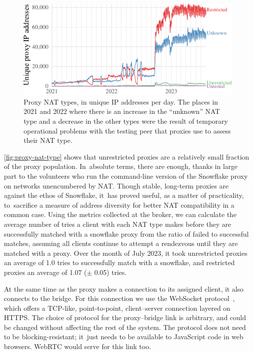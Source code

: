 \documentclass[letterpaper,twocolumn]{article}
\begin{document}
\begin{figure}
\includegraphics{figures/proxies/proxy-nat-type}
\caption{
Proxy NAT types, in unique IP addresses per day.
The places in 2021 and 2022
where there is an increase in the ``unknown'' NAT type
and a decrease in the other types
were the result of temporary operational problems with the
testing peer that proxies use to assess their NAT type.
}
\label{fig:proxy-nat-type}
\end{figure}

\autoref{fig:proxy-nat-type}
shows that unrestricted proxies are
a relatively small fraction of the proxy population.
In~absolute terms, there are enough,
thanks in large part to the volunteers who run
the command-line
version of the Snowflake proxy
on networks unencumbered by NAT.
Though stable, long-term proxies are
against the ethos of Snowflake,
it~has proved useful, as a matter of practicality,
to~sacrifice a measure of address diversity
for better NAT compatibility in a common case.
Using the metrics collected at the broker, we can
calculate the average number of tries a client with
each NAT type makes before they are successfully
matched with a snowflake proxy from the ratio of
failed to successful matches, assuming all clients continue
to attempt a rendezvous until they are matched
with a proxy. Over the month
of July 2023, it took unrestricted proxies
an average of 1.0 tries
to successfully match with a snowflake, and restricted
proxies an average of 1.07 ($\pm$ 0.05) tries.

At the same time as the proxy makes a connection to its assigned client,
it also connects to the bridge.
For this connection we
use the WebSocket protocol~\cite{rfc6455}, which
offers a TCP-like, point-to-point, client--server connection
layered on HTTPS.
The choice of protocol for the proxy--bridge link is arbitrary,
and could be changed
without affecting the rest of the system.
The protocol does not need to be blocking-resistant;
it~just needs to be available to JavaScript code in web browsers.
WebRTC would serve for this link too.
\end{document}

